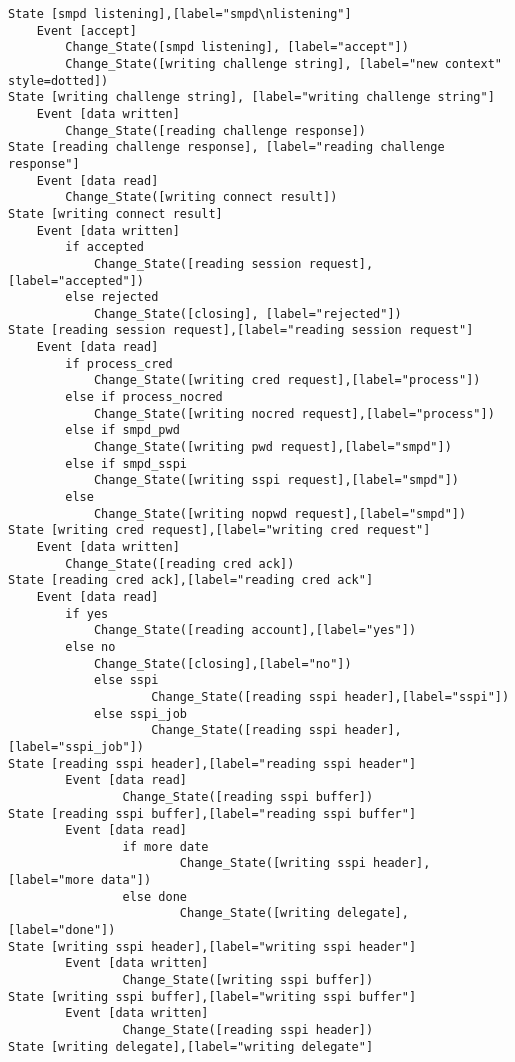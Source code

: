 \begin{comment}
This is the state machine for the smpd listener process.
Graph [smpd listener],
      [size="7.5, 10"]
\end{comment}
\begin{verbatim}
State [smpd listening],[label="smpd\nlistening"]
	Event [accept]
		Change_State([smpd listening], [label="accept"])
		Change_State([writing challenge string], [label="new context" style=dotted])
State [writing challenge string], [label="writing challenge string"]
	Event [data written]
		Change_State([reading challenge response])
State [reading challenge response], [label="reading challenge response"]
	Event [data read]
		Change_State([writing connect result])
State [writing connect result]
	Event [data written]
		if accepted
			Change_State([reading session request], [label="accepted"])
		else rejected
			Change_State([closing], [label="rejected"])
State [reading session request],[label="reading session request"]
	Event [data read]
		if process_cred
			Change_State([writing cred request],[label="process"])
		else if process_nocred
			Change_State([writing nocred request],[label="process"])
		else if smpd_pwd
			Change_State([writing pwd request],[label="smpd"])
		else if smpd_sspi
			Change_State([writing sspi request],[label="smpd"])
		else
			Change_State([writing nopwd request],[label="smpd"])
State [writing cred request],[label="writing cred request"]
	Event [data written]
		Change_State([reading cred ack])
State [reading cred ack],[label="reading cred ack"]
	Event [data read]
		if yes
			Change_State([reading account],[label="yes"])
		else no
			Change_State([closing],[label="no"])
	        else sspi
	                Change_State([reading sspi header],[label="sspi"])
	        else sspi_job
					Change_State([reading sspi header],[label="sspi_job"])
State [reading sspi header],[label="reading sspi header"]
        Event [data read]
                Change_State([reading sspi buffer])
State [reading sspi buffer],[label="reading sspi buffer"]
        Event [data read]
                if more date
                        Change_State([writing sspi header],[label="more data"])
                else done
                        Change_State([writing delegate],[label="done"])
State [writing sspi header],[label="writing sspi header"]
        Event [data written]
                Change_State([writing sspi buffer])
State [writing sspi buffer],[label="writing sspi buffer"]
        Event [data written]
                Change_State([reading sspi header])
State [writing delegate],[label="writing delegate"]

\end{verbatim}
